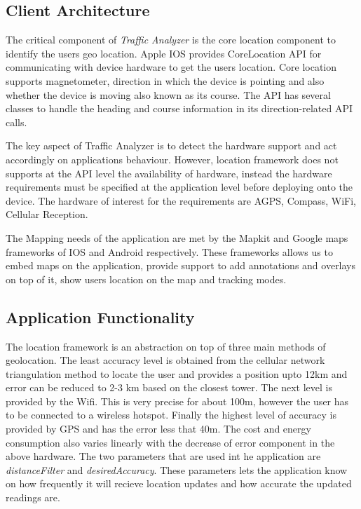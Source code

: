 \documentclass[10pt]{sigplan-proc-varsize}
\begin{document}
\subsection{Client Architecture}

The critical component of \textit{Traffic Analyzer} is the core location component to identify the users geo location. Apple IOS provides CoreLocation API for communicating with device hardware to get the users location. Core location supports magnetometer, direction in which the device is pointing and also whether the device is moving also known as its course. The API has several classes to handle the heading and course information in its direction-related API calls.

The key aspect of Traffic Analyzer is to detect the hardware support and act accordingly on applications behaviour. However, location framework does not supports at the API level the availability of hardware, instead the hardware requirements must be specified at the application level before deploying onto the device. The hardware of interest for the requirements are AGPS, Compass, WiFi, Cellular Reception.

The Mapping needs of the application are met by the Mapkit and Google maps frameworks of IOS and Android respectively. These frameworks allows us to embed maps on the application, provide support to add annotations and overlays on top of it, show users location on the map and tracking modes.

\subsection{Application Functionality}
The location framework is an abstraction on top of three main methods of geolocation. The least accuracy level is obtained from the cellular network triangulation method to locate the user and provides a position upto 12km and error can be reduced to 2-3 km based on the closest tower. The next level is provided by the Wifi. This is very precise for about 100m, however the user has to be connected to a wireless hotspot. Finally the highest level of accuracy is provided by GPS and has the error less that 40m. The cost and energy consumption also varies linearly with the decrease of error component in the above hardware. The two parameters that are used int he application are \textit{distanceFilter} and \textit{desiredAccuracy}. These parameters lets the application know on how frequently it will recieve location updates and how accurate the updated readings are.
\end{document}
